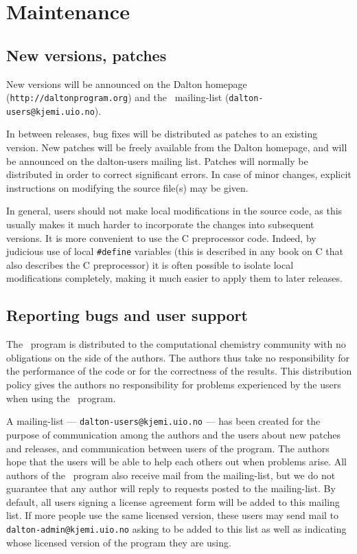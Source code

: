 \chapter{Maintenance}\label{ch:maintain}

\section{New versions, patches}

New versions will be announced on the Dalton homepage
(\verb|http://daltonprogram.org|)
and the \dalton\ mailing-list
(\verb|dalton-users@kjemi.uio.no|).

In between releases, bug fixes will be distributed as
patches to an
existing version. New patches will be
freely available from the 
Dalton homepage, and will be announced on the dalton-users mailing
list. Patches will normally be distributed in order to correct
significant errors. In case of minor changes, explicit
instructions on modifying the source file(s) may be given.

In general, users should not make local
modifications in the source code, as this usually makes it
much harder to incorporate the changes into subsequent versions.
It is more convenient to use the C preprocessor code.  Indeed, by
judicious use of local \verb|#define| variables (this
is described in any book on C that also describes the C
preprocessor) it is often possible to isolate local
modifications completely, making it much easier
to apply them to later
releases.

\section{Reporting bugs and user support}

The \lsdalton\ program is distributed to the computational chemistry
community with no obligations on the side of the
authors. The authors thus take no responsibility
for the performance
of the code or for the correctness of the
results. This distribution
policy gives the authors no responsibility for problems experienced by
the users when using the \lsdalton\ program.

A mailing-list ---
\verb|dalton-users@kjemi.uio.no| --- has been created for
the purpose of communication among the authors and the users about
new patches and releases, and communication between users of the
program. The authors hope that the
users will be able to help each others out when problems
arise. All authors of the \lsdalton\ program also receive mail from the
mailing-list, but we do not guarantee that any author will reply to
requests posted to the mailing-list. By default, all users signing a
license agreement form will be added to this mailing list. If more
people use the same licensed version, these users may send mail to
\verb|dalton-admin@kjemi.uio.no| asking to be added to this list as
well as indicating whose licensed version of the program they are using.

